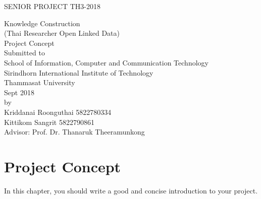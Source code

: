 \documentclass[12pt, a4paper]{report}
\begin{document}
\begin{center}

\large 
\vspace*{2cm}

SENIOR PROJECT TH3-2018\\[1cm]

\LARGE

Knowledge Construction\\(Thai Researcher Open Linked Data)\\[1cm]


Project Concept\\[2cm]
\large
Submitted to \\[1cm]
School of Information, Computer and Communication Technology \\
Sirindhorn International Institute of Technology \\
Thammasat University \\[2cm]
Sept 2018 \\[3cm]
by \\[1cm]
Kriddanai Roonguthai 5822780334\\
Kittikom Sangrit 5822790861\\[2cm]
Advisor: Prof. Dr. Thanaruk Theeramunkong	
\end{center}


\newpage
\pagestyle{plain}
\onehalfspace


\chapter{Project Concept}

In this chapter, you should write a good and concise introduction to your project. 












%

		
\end{document}

